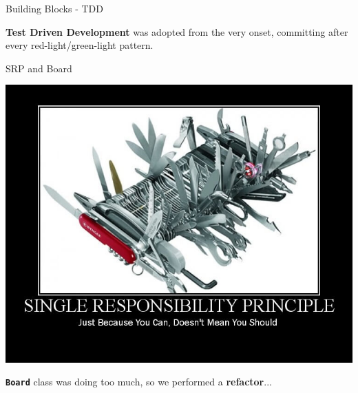 \documentclass{beamer}
\begin{document}
  \begin{frame}{Building Blocks - TDD}

    \begin{centering}


    \end{centering}

    \vspace{1em}

    \textbf{Test Driven Development} was adopted from the very onset, committing after every red-light/green-light pattern.

  \end{frame}



  \begin{frame}{SRP and Board}

    \includegraphics[height=0.35\textwidth]{img/singleresponsibilityprinciple.jpg}

    \vspace{3em}

    \textbf{\texttt{Board}} class was doing too much, so we performed a \textbf{refactor}...

  \end{frame}
\end{document}

